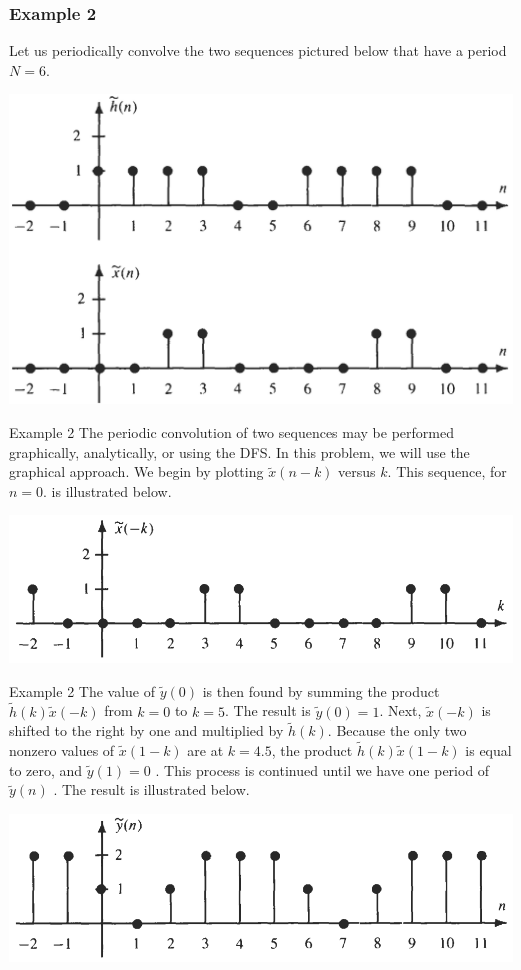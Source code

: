 \documentclass[pdflatex,compress,mathserif]{beamer}
\begin{document}
\begin{frame}
	\frametitle{Example 2}
	Let us periodically convolve the two sequences pictured below that have a period $ N = 6 $.
	
	\begin{center}
		\includegraphics[width=0.7\linewidth]{pic/img01}
	\end{center}
	
\end{frame}

\begin{frame}{Example 2}
	The periodic convolution of two sequences may be performed graphically, analytically, or using the DFS. In this problem,
	we will use the graphical approach. We begin by plotting $ \tilde{x}(n-k) $ versus $ k $. This sequence, for $ n = 0 $. is illustrated below.
	
	\begin{center}
		\includegraphics[width=0.7\linewidth]{pic/img02}
	\end{center}

\end{frame}


\begin{frame}{Example 2}
	The value of $ \tilde{y}(0) $ is then found by summing the product $ \tilde{h}(k)\tilde{x}(-k) $ from $ k=0 $ to $ k=5 $. The result is $ \tilde{y}(0) = 1 $. Next, $ \tilde{x} ( - k ) $ is shifted to the right by one and multiplied by $ \tilde{h} ( k ) $. Because the only two nonzero values of $ \tilde{x}(1 - k ) $ are at $ k = 4.5 $, the product $ \tilde{h}(k)\tilde{x}(1 - k ) $ is equal to zero, and $ \tilde{y} ( 1 ) = 0 $ . This process is continued until we have one period of $ \tilde{y}( n ) $ . The result is illustrated below.
	
	\begin{center}
		\includegraphics[width=0.7\linewidth]{pic/img03}
	\end{center}
\end{frame}
\end{document}
